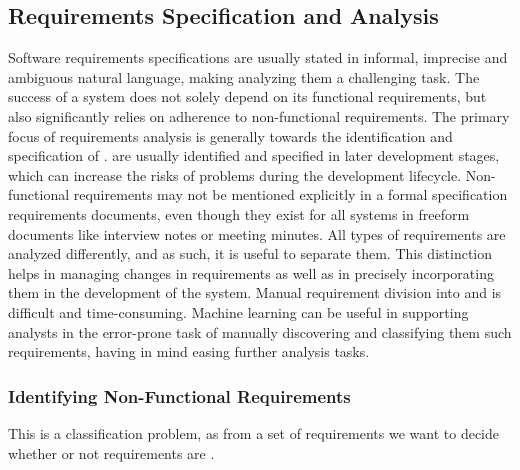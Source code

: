 \subsection{Requirements Specification and Analysis}

Software requirements specifications are usually stated in informal, imprecise
and ambiguous natural language, making analyzing them a challenging task.
The success of a system does not solely depend on its functional requirements,
but also significantly relies on adherence to non-functional requirements.
The primary focus of requirements analysis is generally towards the
identification and specification of \FRs. \NFRs are usually identified and
specified in later development stages, which can increase the risks of problems
during the development lifecycle. Non-functional requirements may not be
mentioned explicitly in a formal specification requirements documents, even
though they exist for all systems in freeform documents like interview notes or
meeting minutes. All types of requirements are analyzed differently, and as
such, it is useful to separate them. This distinction helps in managing changes in requirements as
well as in precisely incorporating them in the development of the system. Manual
requirement division into \FRs and \NFRs is difficult and time-consuming.
Machine learning can be useful in supporting analysts in the error-prone task of
manually discovering and classifying them such requirements, having in mind
easing further analysis tasks.

\subsubsection{Identifying Non-Functional Requirements}
This is a classification problem, as from a set of requirements we want to
decide whether or not requirements are \NFRs. 

